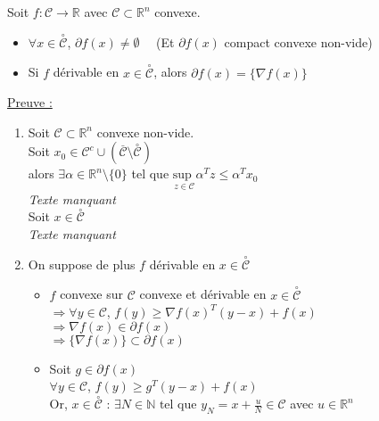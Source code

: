 \documentclass[12pt,a4paper]{article}
\newcommand{\propriete}[2]{%
    \begin{tcolorbox}[colback=white,colframe=green!25!white,title=\textbf{Propriété #1}, coltitle=black]
        #2
    \end{tcolorbox}
}
\begin{document}
\propriete{}{
    Soit $f : \mathcal{C} \rightarrow \mathbb{R}$ avec $\mathcal{C} \subset \mathbb{R}^n$ convexe.
    \begin{itemize}
        \item $\forall x \in \overset{\circ}{\mathcal{C}}$, $\partial f(x) \neq \emptyset \quad$ (Et $\partial f(x)$ compact convexe non-vide)
        \item Si $f$ dérivable en $x \in \overset{\circ}{\mathcal{C}}$, alors $\partial f(x) = \{\nabla f(x)\}$
    \end{itemize}
}

\noindent\underline{Preuve :}
\begin{enumerate}[label=\roman*)]
    \item Soit $\mathcal{C} \subset \mathbb{R}^n$ convexe non-vide.\\
    Soit $x_0 \in \mathcal{C}^c \cup (\overset{\_}{\mathcal{C}} \text{\textbackslash } \overset{\circ}{\mathcal{C}})$\\
    alors $\exists \alpha \in \mathbb{R}^n \text{\textbackslash} \{0\}$ tel que $\underset{z \in \mathcal{C}}{\text{sup }} \alpha^T z \leq \alpha^T x_0$\\

    \textit{Texte manquant}\\


    Soit $x \in \overset{\circ}{\mathcal{C}}$\\

    \textit{Texte manquant}\\


    \item On suppose de plus $f$ dérivable en $x \in \overset{\circ}{\mathcal{C}}$
    \begin{itemize}
        \item $f$ convexe sur $\mathcal{C}$ convexe et dérivable en $x \in \overset{\circ}{\mathcal{C}}$\\
        $\Rightarrow \forall y \in \mathcal{C}$, $f(y) \geq \nabla f(x)^T(y - x) + f(x)$\\
        $\Rightarrow \nabla f(x) \in \partial f(x)$\\
        $\Rightarrow \{\nabla f(x) \} \subset \partial f(x)$\\

        \item Soit $g \in \partial f(x)$\\
        $\forall y \in \mathcal{C}$, $f(y) \geq g^T(y - x) + f(x)$\\
        Or, $x \in \overset{\circ}{\mathcal{C}}$ : $\exists N \in \mathbb{N} \text{ tel que } y_N = x + \frac{u}{N} \in \mathcal{C}$ avec $u \in \mathbb{R}^n$\\


\end{itemize}
\end{enumerate}
\end{document}
